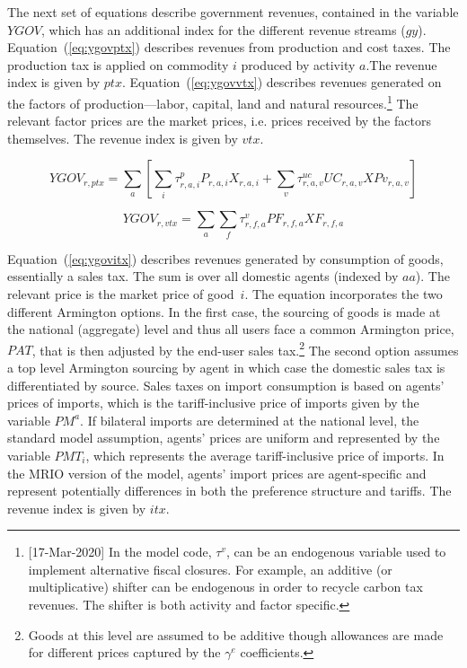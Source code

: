 \documentclass[11pt,letterpaper]{report}
\begin{document}
The next set of equations describe government revenues, contained in the
variable $\mathit{YGOV}$, which has an additional index for the different
revenue streams ($\mathit{gy}$). Equation~(\ref{eq:ygovptx}) describes revenues
from production and cost taxes. The production tax is applied on commodity $i$
produced by activity $a$.The revenue index is given by $\mathit{ptx}$.
Equation~(\ref{eq:ygovvtx}) describes revenues generated on the factors of
production---labor, capital, land and natural resources.\footnote{[17-Mar-2020] In the model code, $\tau^v$, can
be an endogenous variable used to implement alternative fiscal closures.
For example, an additive (or multiplicative) shifter can be endogenous
in order to recycle carbon tax revenues. The shifter is both
activity and factor specific.} The relevant factor
prices are the market prices, i.e. prices received by the factors themselves.
The revenue index is given by $\mathit{vtx}$.

\begin{equation}
\label{eq:ygovptx}
\mathit{YGOV}_{r,ptx} =
   \sum_a{
      \left[
         \sum_i{
            \tau^p_{r,a,i}\mathit{P}_{r,a,i} \mathit{X_{r,a,i}}
         }
      +  \sum_v{
            \tau^\mathit{uc}_{r,a,v} \mathit{UC_{r,a,v}} \mathit{XPv_{r,a,v}}
         }
      \right]
   }
\end{equation}

\begin{equation}
\label{eq:ygovvtx}
\mathit{YGOV}_{r,vtx} =
   \sum_a{
      \sum_f{
         \tau^v_{r,f,a} \mathit{PF}_{r,f,a} \mathit{XF}_{r,f,a}
      }
   }
\end{equation}

Equation~(\ref{eq:ygovitx}) describes revenues generated by consumption of
goods, essentially a sales tax. The sum is over all domestic agents (indexed by
$\mathit{aa}$). The relevant price is the market price of good~$i$. The equation
incorporates the two different Armington options. In the first case, the
sourcing of goods is made at the national (aggregate) level and thus all users
face a common Armington price, $\mathit{PAT}$, that is then adjusted by the
end-user sales tax.\footnote{Goods at this level are assumed to be additive
though allowances are made for different prices captured by the $\gamma^e$
coefficients.} The second option assumes a top level Armington sourcing by agent
in which case the domestic sales tax is differentiated by source. Sales taxes on
import consumption is based on agents' prices of imports, which is the
tariff-inclusive price of imports given by the variable $\mathit{PM}^a$. If
bilateral imports are determined at the national level, the standard model
assumption, agents' prices are uniform and represented by the variable
$\mathit{PMT}_i$, which represents the average tariff-inclusive price of
imports. In the MRIO version of the model, agents' import prices are
agent-specific and represent potentially differences in both the preference
structure and tariffs. The revenue index is given by $\mathit{itx}$.
\end{document}
